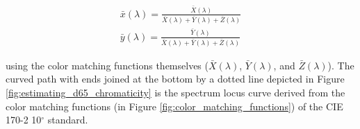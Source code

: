 \documentclass{article}
\begin{document}
\begin{multicols}{2}
\begin{equation} %
    \begin{aligned}
        \bar{x}(\lambda)=\frac{\bar{X}(\lambda)}{\bar{X}(\lambda)+\bar{Y}(\lambda)+\bar{Z}(\lambda)}\\
        \bar{y}(\lambda)=\frac{\bar{Y}(\lambda)}{\bar{X}(\lambda)+\bar{Y}(\lambda)+\bar{Z}(\lambda)}
    \end{aligned}
\end{equation}

using the color matching functions themselves ($\bar{X}(\lambda)$, $\bar{Y}(\lambda)$, and $\bar{Z}(\lambda)$).  The curved path with ends joined at the bottom by a dotted line depicted in Figure \ref{fig:estimating_d65_chromaticity} is the spectrum locus curve derived from the color matching functions (in Figure \ref{fig:color_matching_functions}) of the CIE 170-2 10$^\circ$ standard.


\end{multicols}
\end{document}
